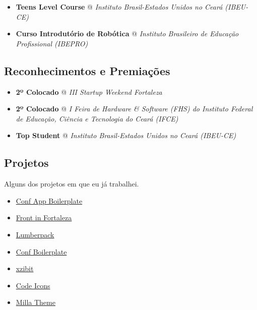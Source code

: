 \documentclass[]{article}
\providecommand{\tightlist}{%
  \setlength{\itemsep}{0pt}\setlength{\parskip}{0pt}}
\begin{document}
\begin{itemize}
\item
  \textbf{Teens Level Course} @ \emph{Instituto Brasil-Estados Unidos no
  Ceará (IBEU-CE)}
\item
  \textbf{Curso Introdutório de Robótica} @ \emph{Instituto Brasileiro
  de Educação Profissional (IBEPRO)}
\end{itemize}

\subsection{Reconhecimentos e
Premiações}\label{reconhecimentos-e-premiauxe7uxf5es}

\begin{itemize}
\item
  \textbf{2º Colocado} @ \emph{III Startup Weekend Fortaleza}
\item
  \textbf{2º Colocado} @ \emph{I Feira de Hardware \& Software (FHS) do
  Instituto Federal de Educação, Ciência e Tecnologia do Ceará (IFCE)}
\item
  \textbf{Top Student} @ \emph{Instituto Brasil-Estados Unidos no Ceará
  (IBEU-CE)}
\end{itemize}

\subsection{Projetos}\label{projetos}

Alguns dos projetos em que eu já trabalhei.

\begin{itemize}
\tightlist
\item
  \href{https://github.com/devevents/conf-app-boilerplate}{Conf App
  Boilerplate}
\item
  \href{https://play.google.com/store/apps/details?id=com.devevents.frontinfortaleza}{Front
  in Fortaleza}
\item
  \href{https://github.com/mabrasil/lumberpack}{Lumberpack}
\item
  \href{https://github.com/mabrasil/conf-boilerplate}{Conf Boilerplate}
\item
  \href{https://github.com/mabrasil/xzibit}{xzibit}
\item
  \href{https://github.com/mabrasil/codeicons}{Code Icons}
\item
  \href{https://github.com/mabrasil/milla-theme}{Milla Theme}
\end{itemize}
\end{document}
